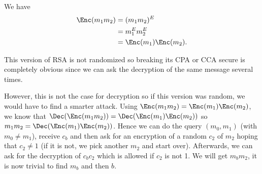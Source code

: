 \begin{solution}
	We have
	\begin{align*}
		\Enc(m_1m_2)
		& = (m_1m_2)^E\\
		& = m_1^Em_2^E\\
		& = \Enc(m_1)\Enc(m_2).
	\end{align*}
	
	This version of RSA is not randomized so breaking its CPA or CCA secure is completely obvious since we can ask
	the decryption of the same message several times.
	
	However, this is not the case for decryption so if this version was random, we would have to find a smarter attack.
	Using $\Enc(m_1 m_2) = \Enc(m_1)\Enc(m_2)$, we know that $\Dec(\Enc(m_1 m_2)) = \Dec(\Enc(m_1)\Enc(m_2))$ so
	$m_1 m_2 = \Dec(\Enc(m_1)\Enc(m_2))$.
	Hence we can do the query $(m_0,m_1)$ (with $m_0 \neq m_1$), receive $c_b$ and then ask for an encryption of a random $c_2$ of $m_2$ hoping that $c_2 \neq 1$ (if it is not, we pick another $m_2$ and start over).
	Afterwards, we can ask for the decryption of $c_bc_2$ which is allowed if $c_2$ is not 1.
	We will get $m_bm_2$, it is now trivial to find $m_b$ and then $b$.
\end{solution}